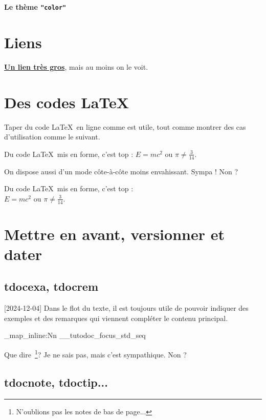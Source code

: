 \documentclass[theme = color]{tutodoc}
\newcommand\thisstyle{color}
\newcommand\myexrmktext{
    \tdocversion{1.7.0}[2024-12-04]
    Dans le flot du texte, il est toujours utile de pouvoir indiquer des exemples et des remarques qui viennent compléter le contenu principal.
}
\newcommand\myhighlightedtext{
    Que dire\,%
    \footnote{
        N'oublions pas les notes de bas de page...
    }?
    Je ne sais pas, mais c'est sympathique. Non ?
}
\begin{document}
\textsf{\Huge\bfseries Le thème \texttt{"\thisstyle"}}

\section{Liens}

{\Large\bfseries \href{https://github.com/bc-tools/for-latex/tree/main/tutodoc}{Un lien très gros}}, mais au moins on le voit.



\section{Des codes \LaTeX}

Taper du code \LaTeX\ en ligne comme  est utile, tout comme montrer des cas d'utilisation comme le suivant.

\begin{tdoclatex}
Du code \LaTeX\ mis en forme, c'est top : $E = m c^2$ ou $\pi \neq \frac{3}{14}$.
\end{tdoclatex}


On dispose aussi d'un mode côte-à-côte moins envahissant. Sympa ! Non ?

\begin{tdoclatex}
Du code \LaTeX\ mis en forme, c'est top : \\
$E = m c^2$ ou $\pi \neq \frac{3}{14}$.
\end{tdoclatex}



\section{Mettre en avant, versionner et dater}

\subsection{tdocexa, tdocrem}

\myexrmktext

\ExplSyntaxOn

\seq_map_inline:Nn \g__tutodoc_focus_std_seq {
    \begin{tdoc#1}
        \myhighlightedtext
    \end{tdoc#1}
}

\ExplSyntaxOff



\subsection{tdocnote, tdoctip...}
\end{document}
